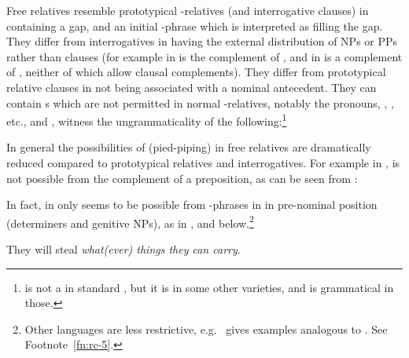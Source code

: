 \documentclass[output=paper
                ,modfonts
                ,nonflat
	        ,collection
	        ,collectionchapter
	        ,collectiontoclongg
 	        ,biblatex
                ,babelshorthands
                ,newtxmath
                ,draftmode
                ,colorlinks, citecolor=brown
]{./langsci/langscibook}
\begin{document}
Free relatives resemble prototypical -relatives (and interrogative clauses) in containing a
gap, and an initial -phrase which is interpreted as filling the gap.  They
differ from interrogatives in having  the external
distribution of NPs or PPs rather than clauses (for example in   is the complement of , and in  
is a complement of , neither of which allow clausal complements). They differ
from prototypical relative clauses in not being associated with a nominal antecedent. They can
contain s which are not permitted in normal -relatives, notably the
 pronouns, , , etc., and , witness the
ungrammaticality of the following:\footnote{ is not a  in
  standard , but it is in some other varieties, and  is grammatical in
  those.}
\begin{exe}\ex\begin{xlist}\label{x:rc-144}
\end{xlist}\end{exe}
In general the possibilities of  (pied-piping) in free relatives are
dramatically reduced compared to prototypical relatives and interrogatives. For example in , 
 is not possible from the complement of a preposition, as can be seen
from :
\begin{exe}\ex\begin{xlist}
\end{xlist}\end{exe}
In fact, in    only seems to be possible from -phrases in in pre-nominal position
(determiners and genitive NPs), as in , and  below.\footnote{Other
  languages are less restrictive, e.g.\ \cite[57]{Mueller99b} gives  examples
  analogous to . See Footnote~\ref{fn:rc-5}.}
\begin{exe}\ex
  \label{x:rc-149} They will steal \emph{what(ever) things they can carry}.
\end{exe}
\end{document}
